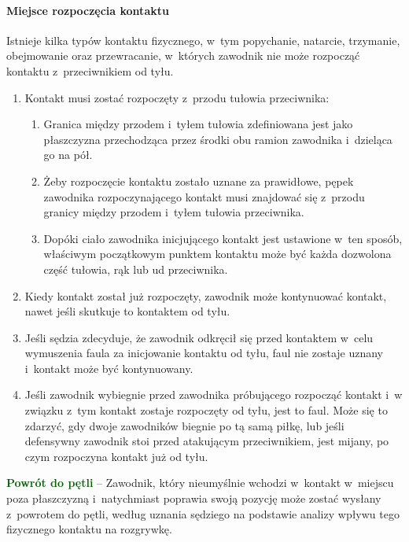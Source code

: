 \documentclass[12pt,a4paper]{article}
\newcommand\other[1]{\bgroup\textcolor{darkgreen}{\textbf{#1}}}
\begin{document}
\paragraph{Miejsce rozpoczęcia kontaktu}
Istnieje kilka typów
kontaktu fizycznego, w~tym popychanie, natarcie, trzymanie, obejmowanie
oraz przewracanie, w~których zawodnik nie może rozpocząć kontaktu z~przeciwnikiem od tyłu.

\begin{enumerate}
	\item
	      Kontakt musi zostać rozpoczęty z~przodu tułowia przeciwnika:

	      \begin{enumerate}
		      \item
		            Granica między przodem i~tyłem tułowia zdefiniowana jest jako
		            płaszczyzna przechodząca przez środki obu ramion zawodnika i~dzieląca go na pół.
		      \item
		            Żeby rozpoczęcie kontaktu zostało uznane za prawidłowe, pępek
		            zawodnika rozpoczynającego kontakt musi znajdować się z~przodu
		            granicy między przodem i~tyłem tułowia przeciwnika.
		      \item
		            Dopóki ciało zawodnika inicjującego kontakt jest ustawione w~ten
		            sposób, właściwym początkowym punktem kontaktu może być każda
		            dozwolona część tułowia, rąk lub ud przeciwnika.
	      \end{enumerate}
	\item
	      Kiedy kontakt został już rozpoczęty, zawodnik może kontynuować
	      kontakt, nawet jeśli skutkuje to kontaktem od tyłu.
	\item
	      Jeśli sędzia zdecyduje, że zawodnik odkręcił się przed kontaktem w~celu wymuszenia faula za inicjowanie kontaktu od tyłu, faul nie
	      zostaje uznany i~kontakt może być kontynuowany.
	\item
	      Jeśli zawodnik wybiegnie przed zawodnika próbującego rozpocząć kontakt
	      i~w związku z~tym kontakt zostaje rozpoczęty od tyłu, jest to faul.
	      Może się to zdarzyć, gdy dwoje zawodników biegnie po tą samą piłkę,
	      lub jeśli defensywny zawodnik stoi przed atakującym przeciwnikiem,
	      jest mijany, po czym rozpoczyna kontakt już od tyłu.
\end{enumerate}

\other{Powrót do pętli} -- Zawodnik, który nieumyślnie wchodzi w~kontakt w~miejscu poza płaszczyzną i~natychmiast poprawia swoją pozycję może
zostać wysłany z~powrotem do pętli, według uznania sędziego na podstawie
analizy wpływu tego fizycznego kontaktu na rozgrywkę.
\end{document}
